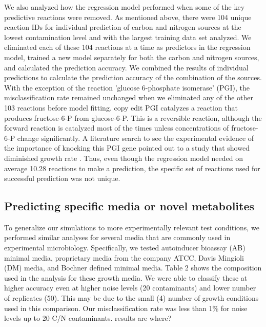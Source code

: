 \documentclass[12pt]{article}
\begin{document}
We also analyzed how the regression model performed when some of the key predictive reactions were removed. As mentioned above, there were 104 unique reaction IDs for individual prediction of carbon and nitrogen sources at the lowest contamination level and with the largest training data set analyzed. We eliminated each of these 104 reactions at a time as predictors in the regression model, trained a new model separately for both the carbon and nitrogen sources, and calculated the prediction accuracy. We combined the results of individual predictions to calculate the prediction accuracy of the combination of the sources. With the exception of the reaction 'glucose 6-phosphate isomerase' (PGI), the misclassification rate remained unchanged when we eliminated any of the other 103 reactions before model fitting. {\color{red} copy edit PGI catalyzes a reaction that produces fructose-6-P from glucose-6-P. This is a reversible reaction, although the forward reaction is catalyzed most of the times unless concentrations of fructose-6-P change significantly. A literature search to see the experimental evidence of the importance of knocking this PGI gene pointed out to a study that showed diminished growth rate \cite{Canonacoetal2001}.} Thus, even though the regression model needed on average 10.28 reactions to make a prediction, the specific set of reactions used for successful prediction was not unique.


\subsection*{Predicting specific media or novel metabolites}

To generalize our simulations to more experimentally relevant test conditions, we performed similar analyses for several media that are commonly used in experimental microbiology. Specifically, we tested autoinducer bioassay (AB) minimal media, proprietary media from the company ATCC, Davis Mingioli (DM) media, and Bochner defined minimal media. Table 2 shows the composition used in the analysis for these growth media. We were able to classify these at higher accuracy even at higher noise levels (20 contaminants) and lower number of replicates (50). This may be due to the small (4) number of growth conditions used in this comparison. Our misclassification rate was less than 1\% for noise levels up to 20 C/N contaminants. {\color{red}results are where?}
\end{document}
